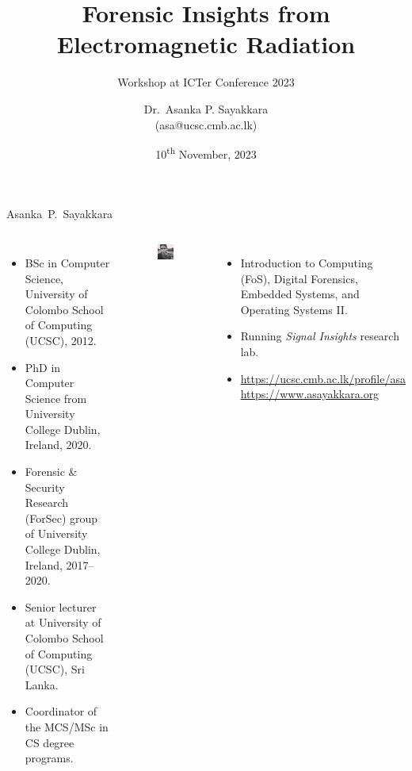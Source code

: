 \documentclass[handout]{beamer}
\title[ICTer 2023]{Forensic Insights from Electromagnetic Radiation}
\subtitle{\footnotesize Workshop at ICTer Conference 2023}
\author[Asanka P. Sayakkara]{
	Dr.~Asanka P. Sayakkara \\ {\scriptsize{(asa@ucsc.cmb.ac.lk)}}
}
\institute[UCSC]{\scriptsize University of Colombo School of Computing\\Sri Lanka.}
\date{\tiny 10\textsuperscript{th} November, 2023}
\begin{document}
\begin{frame}
\titlepage
\end{frame}

\begin{frame}{Asanka~P.~Sayakkara}  

	\begin{columns}
	
	
	\begin{itemize}
	\footnotesize
	\item BSc in Computer Science, University of Colombo School of Computing (UCSC), 2012.
	\vspace{10pt}
	\item PhD in Computer Science from University College Dublin, Ireland, 2020.
	\vspace{10pt}
	\item Forensic \& Security Research (ForSec) group of University College Dublin, Ireland,  2017--2020.
	\vspace{10pt}
	\item Senior lecturer at University of Colombo School of Computing (UCSC), Sri Lanka.
	\vspace{10pt}
	\item Coordinator of the MCS/MSc in CS degree programs.

	\end{itemize}



	\begin{figure}
		\includegraphics[width=80pt]{figures/me-with-mote.jpg}
	\end{figure}

	\begin{itemize}
	\footnotesize
	\item Introduction to Computing (FoS), Digital Forensics, Embedded Systems, and Operating Systems II.
	\vspace{10pt}
	\item Running \emph{Signal Insights} research lab.
	\vspace{10pt}
	\item {\scriptsize \url{https://ucsc.cmb.ac.lk/profile/asa} \\ \url{https://www.asayakkara.org}}
	\end{itemize}

	\end{columns}
\end{frame}
\end{document}
